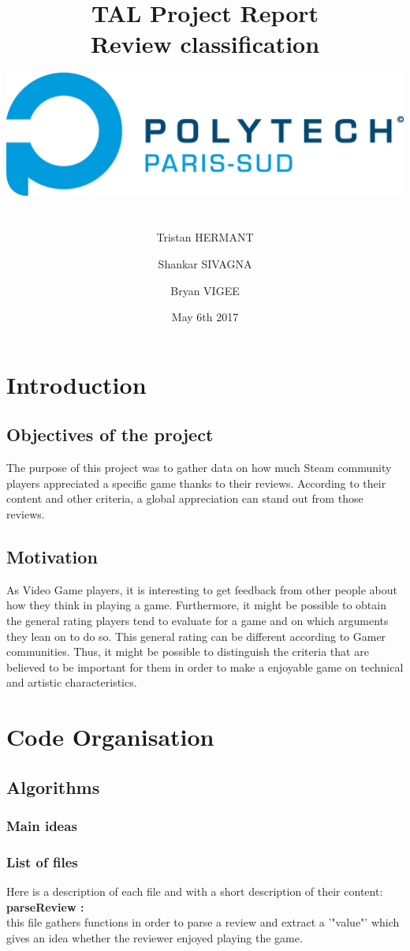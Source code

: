 \documentclass[paper=a4,fontsize=12pt]{report}
\title{ \LARGE \textbf{TAL Project Report
\\Review classification} \\
\includegraphics[width=15cm,height=5cm]{POLYTECH_PARIS-SUD_RVB.jpg}}
\author{\large Tristan HERMANT
\and
Shankar SIVAGNA
\and
Bryan VIGEE}
\date{May 6th 2017}
\begin{document}
\maketitle

\tableofcontents
\setcounter{page}{1}
\chapter{Introduction}
\section{Objectives of the project}
The purpose of this project was to gather data on how much Steam community players appreciated a specific game thanks to their reviews. According to their content and other criteria, a global appreciation can stand out from those reviews. \\

\section{Motivation}
As Video Game players, it is interesting to get feedback from other people about how they think in playing a game. Furthermore, it might be possible to obtain the general rating players tend to evaluate for a game and on which arguments they lean on to do so.  This general rating can be different according to Gamer communities. Thus, it might be possible to distinguish the criteria that are believed to be important for them in order to make a enjoyable game on technical and artistic characteristics. 


\chapter{Code Organisation}
\section{Algorithms}
\subsection{Main ideas}
\subsection{List of files}
Here is a description of each file and with a short description of their content:\\

\textbf{parseReview :} \\
this file gathers functions in order to parse a review and extract a '"value"' which gives an idea whether the reviewer enjoyed playing the game.
\end{document}
